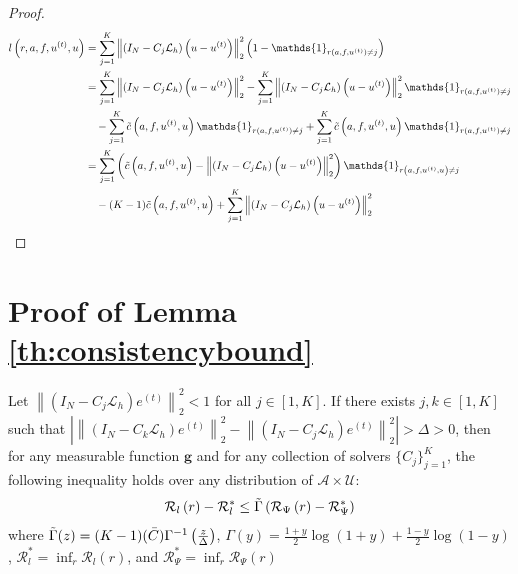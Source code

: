 \documentclass[12pt]{article}
\begin{document}
\begin{proof}

\begin{align*}
    l\left(r, a, f, u^{(t)}, u\right) &=  \sum_{j = 1}^K \left\|\left( I_N - C_{j} \mathcal{L}_{h}\right)\left(u - u^{(t)}\right)\right\|^2_2\left(1 - \mathds{1}_{r(a, f, u^{(t)}) \neq j} \right) \\
    &= \sum_{j = 1}^K \left\|\left( I_N - C_{j} \mathcal{L}_{h}\right)\left(u - u^{(t)}\right)\right\|^2_2 - \sum_{j = 1}^K \left\|\left( I_N - C_{j} \mathcal{L}_{h}\right)\left(u - u^{(t)}\right)\right\|^2_2\mathds{1}_{r(a, f, u^{(t)}) \neq j}\\
    &\quad- \sum_{j = 1}^K\Tilde{c}\left(a, f, u^{(t)}, u\right)\mathds{1}_{r(a, f, u^{(t)}) \neq j} + \sum_{j = 1}^K\Tilde{c}\left(a, f, u^{(t)}, u\right)\mathds{1}_{r(a, f, u^{(t)}) \neq j} \\
    &=  \sum_{j = 1}^K \left(\Tilde{c}\left(a, f, u^{(t)}, u\right) -\left\|\left( I_N - C_{j} \mathcal{L}_{h}\right)\left(u - u^{(t)}\right)\right\|^2_2\right)\mathds{1}_{r\left(a, f, u^{(t)}, u\right) \neq j} \\
    &\quad - (K - 1)\Tilde{c}\left(a, f, u^{(t)}, u\right) + \sum_{j = 1}^K  \left\|\left( I_N - C_{j} \mathcal{L}_{h}\right)\left(u - u^{(t)}\right)\right\|^2_2
\end{align*}
\end{proof}

\section{Proof of Lemma \ref{th:consistencybound}}

\begin{lemma} \label{th:consistencybound}
    Let $\left\|\left( I_N - C_{j} \mathcal{L}_{h}\right) e^{(t)}\right\|^2_2 < 1$ for all $j \in [1, K]$. If there exists $j, k \in [1, K]$ such that $\left|\left\|\left( I_N - C_{k} \mathcal{L}_{h}\right)e^{(t)}\right\|^2_2 - \left\|\left( I_N - C_{j} \mathcal{L}_{h}\right)e^{(t)}\right\|^2_2\right| > \Delta > 0$, then for any measurable function $\mathbf{g}$ and for any collection of solvers $\{C_j\}_{j= 1}^K$, the following inequality holds over any distribution of $\mathcal{A} \times \mathcal{U}$:
    \begin{align*}
        \mathcal{R}_{l}\left(r\right) - \mathcal{R}_{l}^* \leq \Tilde{\Gamma}\left( \mathcal{R}_{\Psi}\left(r\right) - \mathcal{R}_{\Psi}^*\right)
    \end{align*}
    where $\Tilde{\Gamma}(z) = (K - 1)(\Bar{C})\Gamma^{-1}\left(\frac{z}{\Delta}\right)$, $\Gamma(y) = \frac{1 + y}{2}\log(1 + y) + \frac{1 - y}{2}\log(1 - y)$, $\mathcal{R}_{l}^* = \inf_{r} \mathcal{R}_{l}\left(r\right)$, and $\mathcal{R}_{\Psi}^* = \inf_{r} \mathcal{R}_{\Psi}\left(r\right)$
\end{lemma}
\end{document}
